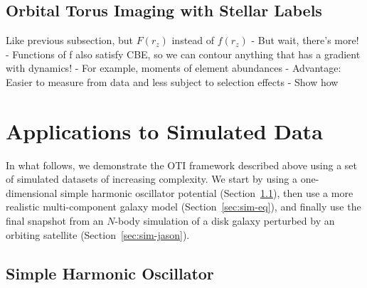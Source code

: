 \subsection{Orbital Torus Imaging with Stellar Labels} \label{sec:oti-labels}
Like previous subsection, but $F(r_z)$ instead of $f(r_z)$
- But wait, there's more!
- Functions of f also satisfy CBE, so we can contour anything that has a gradient with dynamics!
- For example, moments of element abundances
- Advantage: Easier to measure from data and less subject to selection effects
- Show how


\section{Applications to Simulated Data} \label{sec:applications-sim}

In what follows, we demonstrate the OTI framework described above using a set of
simulated datasets of increasing complexity.
We start by using a one-dimensional simple harmonic oscillator potential
(Section~\ref{sec:sim-sho}), then use a more realistic multi-component galaxy model
(Section~\ref{sec:sim-eq}), and finally use the final snapshot from an $N$-body
simulation of a disk galaxy perturbed by an orbiting satellite
(Section~\ref{sec:sim-jason}).


\subsection{Simple Harmonic Oscillator}
\label{sec:sim-sho}

